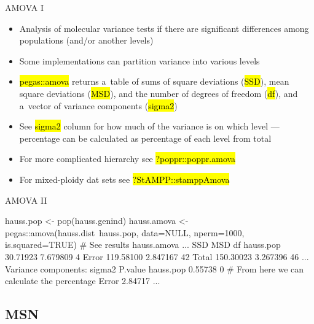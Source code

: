 \documentclass[compress, ucs, xelatex, 11pt, xcolor=svgnames,
	hyperref={
		bookmarks=true,
		unicode=true,
		colorlinks=true,
		pdftitle={Molecular data in R},
		plainpages=false,
		pdfauthor={Vojtech Zeisek},
		pdfsubject={Course about phylogeny and evolution in R},
		pdfcreator={XeLaTeX},
		pdfkeywords={R, evolution, phylogeny, molecular data},
		linkcolor=Tomato,
		anchorcolor=SaddleBrown,
		citecolor=Goldenrod,
		filecolor=DarkMagenta,
		menucolor=Sienna,
		urlcolor=DarkTurquoise,
		pdftex},
	url={hyphens, lowtilde} %
	]{beamer}
\renewcommand{\texttt}[1]{\hl{\ttfamily #1}}
\begin{document}
\begin{frame}{AMOVA I}
	\begin{itemize}
		\item Analysis of molecular variance tests if there are significant differences among populations (and/or another levels)
		\item Some implementations can partition variance into various levels
		\item \texttt{pegas::amova} returns a~table of sums of square deviations (\texttt{SSD}), mean square deviations (\texttt{MSD}), and the number of degrees of freedom (\texttt{df}), and a~vector of variance components (\texttt{sigma2})
		\item See \texttt{sigma2} column for how much of the variance is on which level --- percentage can be calculated as percentage of each level from total
		\item For more complicated hierarchy see \texttt{?poppr::poppr.amova}
		\item For mixed-ploidy dat sets see \texttt{?StAMPP::stamppAmova}
	\end{itemize}
\end{frame}

\begin{frame}[fragile]{AMOVA II}
	\begin{spluscode}
    hauss.pop <- pop(hauss.genind)
    hauss.amova <- pegas::amova(hauss.dist~hauss.pop, data=NULL,
      nperm=1000, is.squared=TRUE)
    # See results
    hauss.amova
    ...
                    SSD      MSD df
    hauss.pop  30.71923 7.679809  4
    Error     119.58100 2.847167 42
    Total     150.30023 3.267396 46
    ...
    Variance components:
               sigma2 P.value
    hauss.pop 0.55738       0 # From here we can calculate the percentage
    Error     2.84717
    ...
	\end{spluscode}
\end{frame}

\subsection{MSN}
\end{document}
